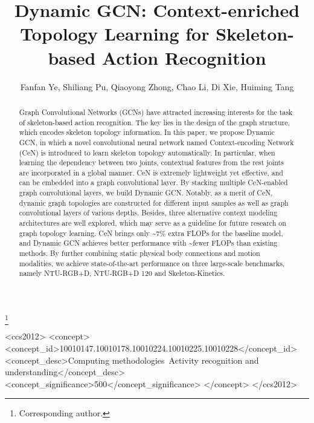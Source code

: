 \documentclass[sigconf]{acmart}
\begin{document}
\title{Dynamic GCN: Context-enriched Topology Learning for Skeleton-based Action Recognition}



\author{Fanfan Ye, Shiliang Pu, Qiaoyong Zhong, Chao Li, Di Xie, Huiming Tang}
\thanks{Corresponding author.}



\renewcommand{\shortauthors}{Ye, Pu and Zhong, et al.}
\fancyhead{}  

\begin{abstract}
 Graph Convolutional Networks (GCNs) have attracted increasing interests for the task of skeleton-based action recognition. The key lies in the design of the graph structure, which encodes skeleton topology information. In this paper, we propose Dynamic GCN, in which a novel convolutional neural network named Context-encoding Network (CeN) is introduced to learn skeleton topology automatically. In particular, when learning the dependency between two joints, contextual features from the rest joints are incorporated in a global manner. CeN is extremely lightweight yet effective, and can be embedded into a graph convolutional layer. By stacking multiple CeN-enabled graph convolutional layers, we build Dynamic GCN. Notably, as a merit of CeN, dynamic graph topologies are constructed for different input samples as well as graph convolutional layers of various depths. Besides, three alternative context modeling architectures are well explored, which may serve as a guideline for future research on graph topology learning. CeN brings only \textasciitilde7\% extra FLOPs for the baseline model, and Dynamic GCN achieves better performance with \textasciitilde fewer FLOPs than existing methods. By further combining static physical body connections and motion modalities, we achieve state-of-the-art performance on three large-scale benchmarks, namely NTU-RGB+D, NTU-RGB+D 120 and Skeleton-Kinetics.
\end{abstract}

\begin{CCSXML}
<ccs2012>
   <concept>
       <concept_id>10010147.10010178.10010224.10010225.10010228</concept_id>
       <concept_desc>Computing methodologies~Activity recognition and understanding</concept_desc>
       <concept_significance>500</concept_significance>
       </concept>
 </ccs2012>
\end{CCSXML}
\end{document}
